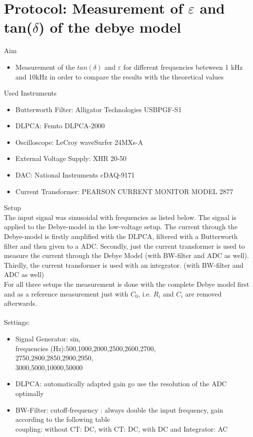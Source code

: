 \section{Protocol: Measurement of $\varepsilon$ and tan($\delta$) of the debye model}
{\Large Aim} \\
\begin{itemize}
\item Measurement of the $tan(\delta)$ and $\varepsilon$ for different frequencies beteween 1 kHz and 10kHz in order to compare the results with the theoretical values
\end{itemize}
{\Large Used Instruments} 
\begin{itemize}
 \item Butterworth Filter: Alligator Technologies USBPGF-S1
 \item DLPCA: Femto DLPCA-2000
 \item Oscilloscope: LeCroy waveSurfer 24MXs-A
 \item External Voltage Supply:  XHR 20-50
 \item DAC: National Instruments cDAQ-9171
 \item Current Transformer: PEARSON CURRENT
MONITOR MODEL 2877
\end{itemize}
{\Large Setup} \\
The input signal was  sinusoidal with frequencies as listed below. The signal is applied to the Debye-model in the low-voltage setup. The current through the Debye-model is firstly amplified with the DLPCA, filtered with a Butterworth filter and then given to a ADC. Secondly, just the current transformer is used to measure the current through the Debye Model (with BW-filter and ADC as well). Thirdly, the current transformer is used with an integrator. (with BW-filter and ADC as well) \\
For all three setups the measurement is done with the complete Debye model first and as a reference measurement just with $C_0$, i.e. $R_i$ and $C_i$ are removed afterwards.\\ 
\\
{\Large Settings:} 
\begin{itemize}
\item Signal Generator:  sin, \\frequencies (Hz):500,1000,2000,2500,2600,2700,\\
2750,2800,2850,2900,2950,\\
3000,5000,10000,50000
\item DLPCA:  automatically adapted gain go use the resolution of the ADC optimally 
\item BW-Filter:  cutoff-frequency : always double the input frequency, gain according to the following table\\ coupling: without CT: DC, with CT: DC, with DC and Integrator: AC
\end{itemize}
